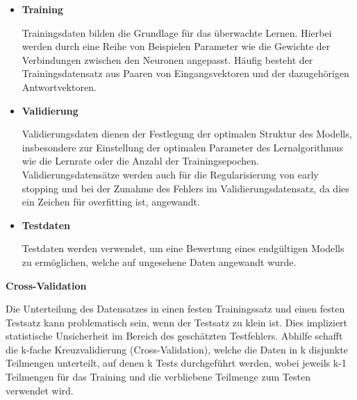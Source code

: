 \begin{itemize} 
\item \textbf{Training} \vspace{5pt}

Trainingsdaten bilden die Grundlage für das überwachte Lernen. Hierbei werden durch eine Reihe von Beispielen Parameter wie die Gewichte der Verbindungen zwischen den Neuronen angepasst. Häufig besteht der Trainingsdatensatz aus Paaren von Eingangsvektoren und der dazugehörigen Antwortvektoren. \vspace{10pt}

\item \textbf{Validierung} \vspace{5pt}

Validierungsdaten dienen der Festlegung der optimalen Struktur des Modells, insbesondere zur Einstellung der optimalen Parameter des Lernalgorithmus wie die Lernrate oder die Anzahl der Trainingsepochen. Validierungsdatensätze werden auch für die Regularisierung von  \dq early stopping\grqq{} und bei der Zunahme des Fehlers im Validierungsdatensatz, da dies ein Zeichen für  \dq overfitting\grqq{} ist, angewandt. \vspace{10pt}

\item \textbf{Testdaten} \vspace{5pt}

Testdaten werden verwendet, um eine Bewertung eines endgültigen Modells zu ermöglichen, welche auf ungesehene Daten angewandt wurde.

\end{itemize}\vspace{10pt}


\textbf{Cross-Validation} \vspace{10pt}

Die Unterteilung des Datensatzes in einen festen Trainingssatz und einen festen Testsatz kann problematisch sein, wenn der Testsatz zu klein ist. Dies impliziert statistische Unsicherheit im Bereich des geschätzten Testfehlers. Abhilfe schafft die k-fache Kreuzvalidierung (Cross-Validation), welche die Daten in k disjunkte Teilmengen unterteilt, auf denen k Tests durchgeführt werden, wobei jeweils k-1 Teilmengen für das Training und die verbliebene Teilmenge zum Testen verwendet wird. 


